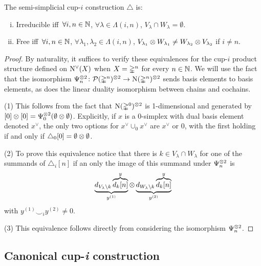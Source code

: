 \begin{lemma}\label{l:properties}
	The semi-simplicial \mbox{cup-$i$} construction $\triangle$ is:
	\begin{enumerate}[(i)]
		\item Irreducible iff\,
		$\forall i,n \in \mathbb{N}$, $\forall \lambda \in \Lambda(i,n)$, $V_\lambda \cap W_\lambda = \emptyset$.
		\item Free iff\,
		$\forall i,n \in \mathbb{N}$, $\forall \lambda_1, \lambda_2 \in \Lambda(i,n)$, $V_{\lambda_1} \otimes W_{\lambda_1} \neq W_{\lambda_2} \otimes V_{\lambda_2}$ if $i \neq n$.
	\end{enumerate}
\end{lemma}

\begin{proof}
	By naturality, it suffices to verify these equivalences for the \mbox{cup-$i$} product structure defined on $\operatorname{N^{\vee}}(X)$ when $X = \mathbb{\Delta}^n$ for every $n \in \mathbb{N}$.
	We will use the fact that the isomorphism $\Psi_n^{\otimes 2} \colon \mathcal{P}(\mathbb{\Delta}^n)^{\otimes 2} \to \operatorname{N}(\mathbb{\Delta}^n)^{\otimes 2}$ sends basis elements to basis elements, as does the linear duality isomorphism between chains and cochains.

	\noindent (1) This follows from the fact that $\operatorname{N}(\mathbb{\Delta}^0)^{\otimes 2}$ is 1-dimensional and generated by $[0] \otimes [0] = \Psi_0^{\otimes 2} (\emptyset \otimes \emptyset)$.
	Explicitly, if $x$ is a $0$-simplex with dual basis element denoted $x^\vee$, the only two options for $x^\vee \cup_0 x^\vee$ are $x^\vee$ or $0$, with the first holding if and only if $\triangle_0[0] = \emptyset \otimes \emptyset$.

	\noindent (2) To prove this equivalence notice that there is $k \in V_\lambda \cap W_\lambda$ for one of the summands of $\triangle_i [n]$ if an only the image of this summand under $\Psi_n^{\otimes 2}$ is
	\[
	\underbrace{d_{V_\lambda \setminus k} \overbrace{d_k[n]}^{y}}_{y^{(1)}}
	\otimes
	\underbrace{d_{W_\lambda \setminus k} \overbrace{d_k[n]}^{y}}_{y^{(2)}}
	\]
	with $y^{(1)} \smallsmile_i y^{(2)} \neq 0$.

	\noindent (3) This equivalence follows directly from considering the isomorphism $\Psi_n^{\otimes 2}$.
\end{proof}

\subsection{Canonical cup-\textit{i} construction}

